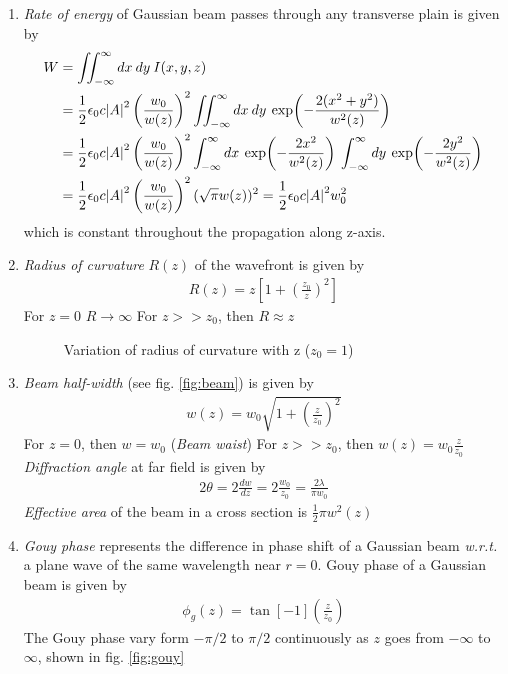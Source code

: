 \documentclass[11pt,a4paper]{article}
\numberwithin{equation}{section}
\begin{document}
\begin{enumerate}
	\item
	\textit{Rate of energy} of Gaussian beam passes through any transverse plain is given by
	\begin{align}
		W&= \iint_{-\infty}^{\infty} dx\:dy\:I(x,y,z)\nonumber\\
		&= \frac{1}{2} \epsilon_0c \abs{A}^2 \left(\frac{w_0}{w(z)}\right)^2 \iint_{-\infty}^{\infty} dx\:dy\: \exp(-\frac{2(x^2+y^2)}{w^2(z)}\nonumber)\\
		&= \frac{1}{2} \epsilon_0c \abs{A}^2 \left(\frac{w_0}{w(z)}\right)^2 \int_{-\infty}^{\infty} dx\: \exp(-\frac{2x^2}{w^2(z)})\: \int_{-\infty}^{\infty} dy\: \exp(-\frac{2y^2}{w^2(z)})\nonumber\\
		&=  \frac{1}{2}\epsilon_0c \abs{A}^2 \left(\frac{w_0}{w(z)}\right)^2 (\sqrt{\pi} w(z))^2 = \frac{1}{2}\epsilon_0c \abs{A}^2 w_0^2
	\end{align} which is constant throughout the propagation along z-axis.
	
	\item
	\textit{Radius of curvature} $R(z)$ of the wavefront is given by
	\begin{align}
		R(z)= z\left[1+\left(\frac{z_0}{z}\right)^2\right]
	\end{align}
	\subitem For $z=0$ $R\rightarrow\infty$
	\subitem For $z>>z_0$, then $R\approx z$
	
	\begin{figure}[H]
		\centering
		\scalebox{0.7}{}
		\caption{Variation of radius of curvature with z ($z_0=1$)}
		\label{fig:R vs z}
	\end{figure}
	
	\item
	\textit{Beam half-width} (see fig. \ref{fig:beam}) is given by 
	\begin{align}
		w(z)= w_0\sqrt{1+\left(\frac{z}{z_0}\right)^2}
	\end{align}
	\subitem For $z=0$, then $w = w_0$ (\textit{Beam waist})
	\subitem For $z>>z_0$, then $w(z)= w_0\frac{z}{z_0}$
	\subitem \textit{Diffraction angle} at far field is given by 
	\begin{align}
		2\theta = 2\frac{dw}{dz} = 2\frac{w_0}{z_0} = \frac{2\lambda}{\pi w_0}
	\end{align}
	\subitem \textit{Effective area} of the beam in a cross section is $\displaystyle \frac{1}{2} \pi w^2(z)$
	
	\item 
	\textit{Gouy phase} represents the difference in phase shift of a Gaussian beam \textit{w.r.t.} a plane wave of the same wavelength near $r=0$.\cite{conry 12}
	Gouy phase of a Gaussian beam is given by
	\begin{align}
		\phi_g (z) = \tan[-1](\frac{z}{z_0})
	\end{align}
	The Gouy phase vary form $-\pi/2$ to $\pi/2$ continuously as $z$ goes from $-\infty$ to $\infty$, shown in fig. \ref{fig:gouy}
	

\end{enumerate}
\end{document}
